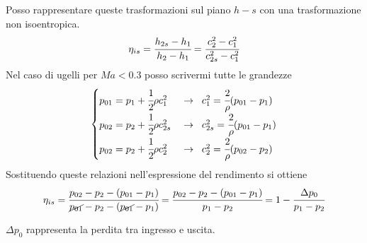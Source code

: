 Posso rappresentare queste trasformazioni sul piano $h-s$ con una trasformazione non isoentropica. 
\begin{align*}
\eta_{is} = \cfrac{h_{2s} - h_1}{h_2-h_1} = \cfrac{c_2^2 - c_1^2}{c_{2s}^2 - c_1^2}
\end{align*}
Nel caso di ugelli per $Ma < 0.3$ posso scrivermi tutte le grandezze
\begin{align*}
\begin{cases}
p_{01} = p_1 + \cfrac{1}{2} \rho c_1^2 \;& \to  \;\; c_1^2 = \cfrac{2}{\rho} (p_{01} - p_1)\\
p_{02} = p_2 + \cfrac{1}{2} \rho c_{2s}^2 \;& \to  \;\; c_{2s}^2 = \cfrac{2}{\rho} (p_{01} - p_1)\\
p_{02} = p_2 + \cfrac{1}{2} \rho c_2^2 \;& \to  \;\; c_2^2 = \cfrac{2}{\rho} (p_{02} - p_2)
\end{cases}
\end{align*}
Sostituendo queste relazioni nell'espressione del rendimento si ottiene
\begin{align*}
\eta_{is} = \cfrac{p_{02} - p_2 - (p_{01} - p_1)}{\cancel{p_{01}} - p_2 - (\cancel{p_{01}} - p_1)}=\cfrac{p_{02} - p_2 -(p_{01} - p_1)}{p_1-p_2}=1- \cfrac{\Delta p_0}{p_1 - p_2}
\end{align*}

$\Delta p_0$ rappresenta la perdita tra ingresso e uscita. 

